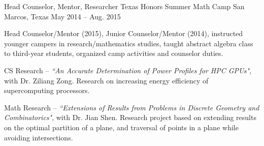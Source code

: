 \begin{cventries}
    {Head Counselor, Mentor, Researcher}
    {Texas Honors Summer Math Camp}
    {San Marcos, Texas}
    {May 2014 -- Aug. 2015}
    {
      \begin{cvitems}
        \item {Head Counselor/Mentor (2015), Junior Counselor/Mentor (2014), instructed younger campers in research/mathematics studies, taught abstract algebra class to third-year students, organized camp activities and counselor duties.}
        \item {CS Research -- \emph{``An Accurate Determination of Power Profiles for HPC GPUs"}, with Dr. Ziliang Zong. Research on increasing energy efficiency of supercomputing processors.}
        \item {Math Research -- \emph{``Extensions of Results from Problems in Discrete Geometry and Combinatorics"}, with Dr. Jian Shen. Research project based on extending results on the optimal partition of a plane, and traversal of points in a plane while avoiding intersections.}
      \end{cvitems} 
    }
\end{cventries}
